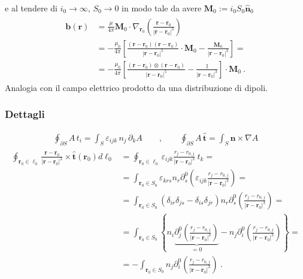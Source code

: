 \documentclass[letterpaper,10pt,italian]{jupyterBook}
\begin{document}
\sphinxAtStartPar
e al tendere di \(i_0 \rightarrow \infty\), \(S_0 \rightarrow 0\) in modo tale da avere \(\mathbf{M}_0 := i_0 S_0 \hat{\mathbf{n}}_0\)
\begin{equation*}
\begin{split}\begin{aligned}
 \mathbf{b}(\mathbf{r}) 
  & = \frac{\mu}{4 \pi} \mathbf{M}_0 \cdot \nabla_{\mathbf{r}_0} \left( \frac{\mathbf{r} - \mathbf{r}_0}{|\mathbf{r} - \mathbf{r}_0|^3} \right) \\
  & = - \frac{\mu_0}{4\pi} \left[ \frac{(\mathbf{r}-\mathbf{r}_0)(\mathbf{r}-\mathbf{r}_0)}{|\mathbf{r}-\mathbf{r}_0|^5} \cdot \mathbf{M}_0 - \frac{\mathbf{M}_0}{|\mathbf{r}-\mathbf{r}_0|^3} \right] = \\
  & = - \frac{\mu_0}{4\pi} \left[ \frac{(\mathbf{r}-\mathbf{r}_0) \otimes (\mathbf{r}-\mathbf{r}_0)}{|\mathbf{r}-\mathbf{r}_0|^5} - \frac{\mathbb{I}}{|\mathbf{r}-\mathbf{r}_0|^3} \right] \cdot \mathbf{M}_0 \ .
\end{aligned}\end{split}
\end{equation*}
\sphinxAtStartPar
{} Analogia con il campo elettrico prodotto da una distribuzione di dipoli.
\subsubsection*{Dettagli}
\begin{equation*}
\begin{split}\oint_{\partial S} A \, t_i = \int_S \varepsilon_{ijk} \, n_j \, \partial_k A
\qquad , \qquad 
  \oint_{\partial S} A \, \hat{\mathbf{t}} = \int_S \hat{\mathbf{n}} \times \nabla A\end{split}
\end{equation*}\begin{equation*}
\begin{split}\begin{aligned}
\oint_{\mathbf{r}_0 \in \ell_0} \frac{\mathbf{r} - \mathbf{r}_0}{|\mathbf{r} - \mathbf{r}_0|^3} \times \hat{\mathbf{t}}(\mathbf{r}_0) d \ell_0 
  & = \oint_{\mathbf{r}_0 \in \ell_0} \varepsilon_{ijk} \frac{r_j - r_{0,j}}{|\mathbf{r} - \mathbf{r}_0|^3} \ t_k = \\
  & = \int_{\mathbf{r}_0 \in S_0} \varepsilon_{krs} n_r \partial^0_s \left( \varepsilon_{ijk} \frac{r_j - r_{0,j}}{|\mathbf{r} - \mathbf{r}_0|^3} \right) = \\
  & = \int_{\mathbf{r}_0 \in S_0} \left( \delta_{ir} \delta_{js} - \delta_{is} \delta_{jr} \right) n_r \partial^0_s \left( \frac{r_j - r_{0,j}}{|\mathbf{r} - \mathbf{r}_0|^3} \right) = \\
  & = \int_{\mathbf{r}_0 \in S_0} \left\{ n_i \underbrace{\partial^0_j \left( \frac{r_j - r_{0,j}}{|\mathbf{r} - \mathbf{r}_0|^3} \right)}_{=0} - n_j \partial^0_i \left( \frac{r_j - r_{0,j}}{|\mathbf{r} - \mathbf{r}_0|^3} \right) \right\} = \\
  & = - \int_{\mathbf{r}_0 \in S_0} n_j \partial^0_i \left( \frac{r_j - r_{0,j}}{|\mathbf{r} - \mathbf{r}_0|^3} \right) \ .
\end{aligned}\end{split}
\end{equation*}
\end{document}
